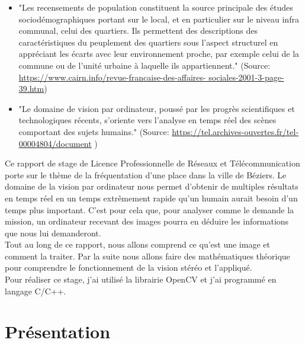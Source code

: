 \documentclass[12pt, french]{report}
\begin{document}
    \begin{itemize}
        \item "Les recensements de population constituent la source principale des études sociodémographiques portant sur le local, et en particulier sur le niveau infra communal, celui des quartiers. Ils permettent des descriptions des caractéristiques du peuplement des quartiers sous l’aspect structurel en appréciant les écarts avec leur environnement proche, par exemple celui de la commune ou de l’unité urbaine à laquelle ils appartiennent."
        (Source: \href{https://www.cairn.info/revue-francaise-des-affaires- sociales-2001-3-page-39.htm}{https://www.cairn.info/revue-francaise-des-affaires- sociales-2001-3-page-39.htm})\\
        

    \item "Le domaine de vision par ordinateur, poussé par les progrès scientifiques et technologiques récents, s’oriente vers l’analyse en temps réel des scènes comportant des sujets humains." (Source: \href{https://tel.archives-ouvertes.fr/tel-00004804/document}{https://tel.archives-ouvertes.fr/tel-00004804/document} ) %
    \\
    \end{itemize}
        
    Ce rapport de stage de Licence Professionnelle de Réseaux et Télécommunication porte sur le thème de la fréquentation d'une place dans la ville de Béziers. Le domaine de la vision par ordinateur nous permet d'obtenir de multiples résultats en temps réel en un temps extrêmement rapide qu'un humain aurait besoin d'un temps plus important. C'est pour cela que, pour analyser comme le demande la mission, un ordinateur recevant des images pourra en déduire les informations que nous lui demanderont. \\
    Tout au long de ce rapport, nous allons comprend ce qu'est une image et comment la traiter. Par la suite nous allons faire des mathématiques théorique pour comprendre le fonctionnement de la vision stéréo et l'appliqué. \\
    Pour réaliser ce stage, j'ai utilisé la librairie OpenCV et j'ai programmé en langage C/C++.

\newpage
\section*{Présentation}
\end{document}
